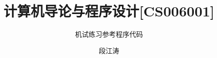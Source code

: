 \documentclass[graybox,envcountchap,sectrefs]{svmono}
\begin{document}
\author{段江涛}
\title{ 计算机导论与程序设计[CS006001]}
\subtitle{机试练习参考程序代码 }



\date{\zhtoday}

\maketitle  %



\tableofcontents   %



\end{document}
